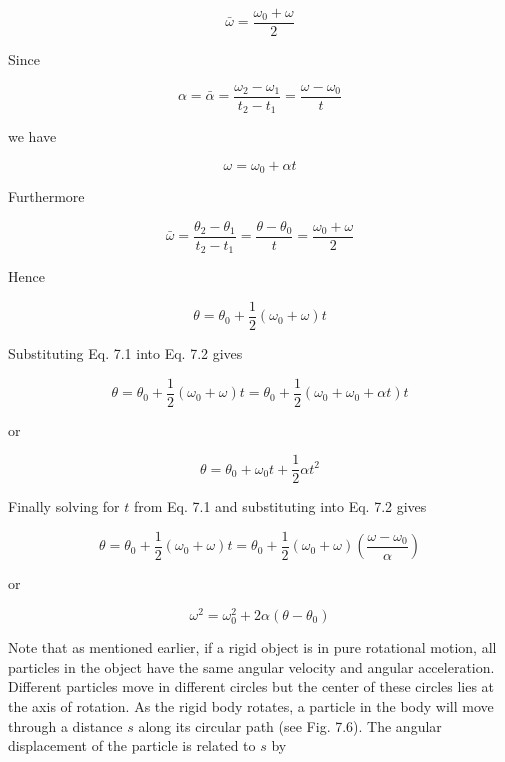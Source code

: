 \documentclass[10pt]{article}
\begin{document}
$$
\bar{\omega}=\frac{\omega_{0}+\omega}{2}
$$

Since

$$
\alpha=\bar{\alpha}=\frac{\omega_{2}-\omega_{1}}{t_{2}-t_{1}}=\frac{\omega-\omega_{0}}{t}
$$

we have


\begin{equation*}
\omega=\omega_{0}+\alpha t \tag{7.1}
\end{equation*}


Furthermore

$$
\bar{\omega}=\frac{\theta_{2}-\theta_{1}}{t_{2}-t_{1}}=\frac{\theta-\theta_{0}}{t}=\frac{\omega_{0}+\omega}{2}
$$

Hence


\begin{equation*}
\theta=\theta_{0}+\frac{1}{2}\left(\omega_{0}+\omega\right) t \tag{7.2}
\end{equation*}


Substituting Eq. 7.1 into Eq. 7.2 gives

$$
\theta=\theta_{0}+\frac{1}{2}\left(\omega_{0}+\omega\right) t=\theta_{0}+\frac{1}{2}\left(\omega_{0}+\omega_{0}+\alpha t\right) t
$$

or


\begin{equation*}
\theta=\theta_{0}+\omega_{0} t+\frac{1}{2} \alpha t^{2} \tag{7.3}
\end{equation*}


Finally solving for $t$ from Eq. 7.1 and substituting into Eq. 7.2 gives

$$
\theta=\theta_{0}+\frac{1}{2}\left(\omega_{0}+\omega\right) t=\theta_{0}+\frac{1}{2}\left(\omega_{0}+\omega\right)\left(\frac{\omega-\omega_{0}}{\alpha}\right)
$$

or


\begin{equation*}
\omega^{2}=\omega_{0}^{2}+2 \alpha\left(\theta-\theta_{0}\right) \tag{7.4}
\end{equation*}


Note that as mentioned earlier, if a rigid object is in pure rotational motion, all particles in the object have the same angular velocity and angular acceleration. Different particles move in different circles but the center of these circles lies at the axis of rotation. As the rigid body rotates, a particle in the body will move through a distance $s$ along its circular path (see Fig. 7.6). The angular displacement of the particle is related to $s$ by
\end{document}
